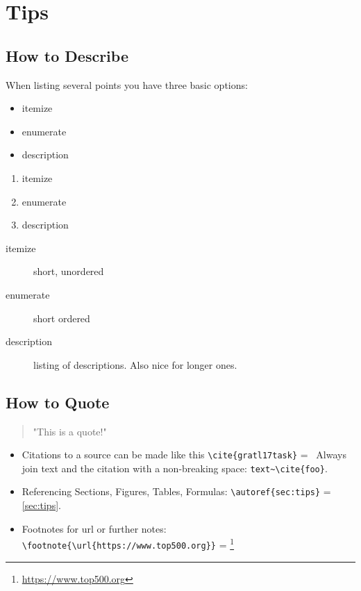 \documentclass[11pt,
               a4paper,
               bibtotoc,
               idxtotoc,
               headsepline,
               footsepline,
               footexclude,
               BCOR12mm,
               DIV13,
               openany,   %
               ]
               {scrbook}
\begin{document}
\section{Tips}
\subsection{How to Describe}
\setlength{\columnsep}{30 pt}
When listing several points you have three basic options:
\begin{multicols}{3}
	\begin{itemize}
		\item itemize
		\item enumerate
		\item description
	\end{itemize}
	
	\vfill\null
	\columnbreak
	
	\begin{enumerate}
		\item itemize
		\item enumerate
		\item description
	\end{enumerate}
	
	\vfill\null
	\columnbreak
	
	\begin{description}
		\item[itemize] short, unordered
		\item[enumerate] short ordered
		\item[description] listing of descriptions. Also nice for longer ones.
	\end{description}
	
\end{multicols}


\subsection{How to Quote}

\begin{quote}
	"This is a quote!"
\end{quote}

\begin{itemize}
	\item Citations to a source can be made like this \verb|\cite{gratl17task}| =~\cite{gratl17task}
	\subitem Always join text and the citation with a non-breaking space: \verb|text~\cite{foo}|.
	\item Referencing Sections, Figures, Tables, Formulas: \verb|\autoref{sec:tips}| = \autoref{sec:tips}.
	\item Footnotes for url or further notes: \verb|\footnote{\url{https://www.top500.org}}| = \footnote{\url{https://www.top500.org}}
\end{itemize}
\end{document}
